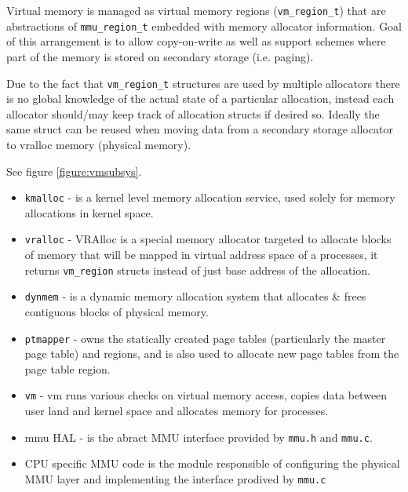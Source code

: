 Virtual memory is managed as virtual memory regions (\verb+vm_region_t+) that
are abstractions of \verb+mmu_region_t+ embedded with memory allocator
information. Goal of this arrangement is to allow copy-on-write as well as
support schemes where part of the memory is stored on secondary storage
(i.e. paging).

Due to the fact that \verb+vm_region_t+ structures are used by multiple
allocators there is no global knowledge of the actual state of a particular
allocation, instead each allocator should/may keep track of allocation structs
if desired so. Ideally the same struct can be reused when moving data from a
secondary storage allocator to vralloc memory (physical memory).


See figure \ref{figure:vmsubsys}.

\begin{itemize}
  \item \verb+kmalloc+  - is a kernel level memory allocation service, used
                        solely for memory allocations in kernel space.
  \item \verb+vralloc+  - VRAlloc is a special memory allocator targeted to
                        allocate blocks of memory that will be mapped in virtual
                        address space of a processes, it returns
                        \verb+vm_region+ structs instead of just base address of
                        the allocation.
  \item \verb+dynmem+   - is a dynamic memory allocation system that allocates
                        \& frees contiguous blocks of physical memory.
  \item \verb+ptmapper+ - owns the statically created page tables (particularly
                        the master page table) and regions, and is also used to
                        allocate new page tables from the page table region.
  \item \verb+vm+       - vm runs various checks on virtual memory access,
                        copies data between user land and kernel space and
                        allocates memory for processes.
  \item mmu HAL -       is the abract MMU interface provided by \verb+mmu.h+
                        and \verb+mmu.c+.
  \item CPU specific MMU code is the module responsible of configuring the
        physical MMU layer and implementing the interface prodived by
        \verb+mmu.c+
\end{itemize}

